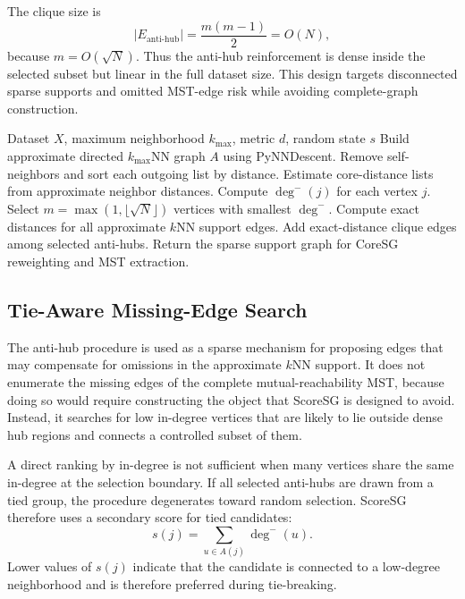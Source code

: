 \documentclass[11pt]{article}
\begin{document}
The clique size is
\begin{equation}
  |E_{\mathrm{anti\text{-}hub}}|=\frac{m(m-1)}{2}=O(N),
\end{equation}
because \(m=O(\sqrt{N})\). Thus the anti-hub reinforcement is dense inside the selected subset but linear in the full dataset size. This design targets disconnected sparse supports and omitted MST-edge risk while avoiding complete-graph construction.

\begin{algorithm}[H]
\caption{ScoreSG support-graph construction}
\label{alg:scoresg}
\begin{algorithmic}[1]
\Require Dataset \(X\), maximum neighborhood \(k_{\max}\), metric \(d\), random state \(s\)
\State Build approximate directed \(k_{\max}\)NN graph \(A\) using PyNNDescent.
\State Remove self-neighbors and sort each outgoing list by distance.
\State Estimate core-distance lists from approximate neighbor distances.
\State Compute \(\deg^{-}(j)\) for each vertex \(j\).
\State Select \(m=\max(1,\lfloor\sqrt{N}\rfloor)\) vertices with smallest \(\deg^{-}\).
\State Compute exact distances for all approximate \(k\)NN support edges.
\State Add exact-distance clique edges among selected anti-hubs.
\State Return the sparse support graph for CoreSG reweighting and MST extraction.
\end{algorithmic}
\end{algorithm}

\subsection{Tie-Aware Missing-Edge Search}
\label{sec:tie-aware-missing-edge}

The anti-hub procedure is used as a sparse mechanism for proposing edges that may compensate for omissions in the approximate \(k\)NN support. It does not enumerate the missing edges of the complete mutual-reachability MST, because doing so would require constructing the object that ScoreSG is designed to avoid. Instead, it searches for low in-degree vertices that are likely to lie outside dense hub regions and connects a controlled subset of them.

A direct ranking by in-degree is not sufficient when many vertices share the same in-degree at the selection boundary. If all selected anti-hubs are drawn from a tied group, the procedure degenerates toward random selection. ScoreSG therefore uses a secondary score for tied candidates:
\begin{equation}
  s(j)=\sum_{u\in A(j)} \deg^{-}(u).
\end{equation}
Lower values of \(s(j)\) indicate that the candidate is connected to a low-degree neighborhood and is therefore preferred during tie-breaking.
\end{document}
